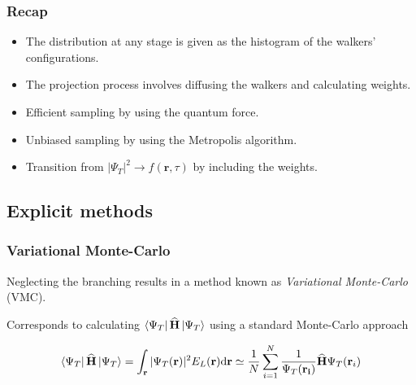 \begin{frame}
 \frametitle{Recap}
 
 \begin{itemize}
 \item The distribution at any stage is given as the histogram of the walkers' configurations.
 \pause \item The projection process involves diffusing the walkers and calculating weights.
 \pause \item Efficient sampling by using the quantum force.
 \pause \item Unbiased sampling by using the Metropolis algorithm.
 \pause \item Transition from $|\Psi_T|^2 \to f(\mathbf{r}, \tau)$ by including the weights.
 \end{itemize}

\end{frame}

\subsection{Explicit methods}

\begin{frame}
 \frametitle{Variational Monte-Carlo}
 Neglecting the branching results in a method known as \textit{Variational Monte-Carlo} (VMC).
 \shift
 
 Corresponds to calculating $\left< \Psi_T \right|{\bf\widehat{H}}\left| \Psi_T \right>$ using a standard Monte-Carlo approach
 
 \begin{equation*}
  \left< \Psi_T \right|{\bf\widehat{H}}\left| \Psi_T \right> = \int_\mathbf{r} |\Psi_T(\mathbf{r})|^2 E_L(\mathbf{r})\mathrm{d}\mathbf{r} \simeq \frac{1}{N}\sum_{i=1}^N \frac{1}{\Psi_T(\mathbf{r_i})}{\bf\widehat{H}}\Psi_T(\mathbf{r}_i) 
 \end{equation*}
 
\end{frame}


